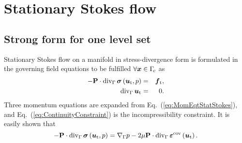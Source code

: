 \documentclass[12pt, twoside, english]{article}
\numberwithin{equation}{section}
\newcommand{\vek}[1]{\mathchoice{\displaystyle\boldsymbol#1}
{\textstyle\boldsymbol#1}{\scriptstyle\boldsymbol#1}
{\scriptscriptstyle\boldsymbol#1}}
\newcommand{\mat}[1]{\mathchoice{\displaystyle\mathbf#1}
{\textstyle\mathbf#1}{\scriptstyle\mathbf#1}
{\scriptscriptstyle\mathbf#1}}
\newcommand{\ti}{ \ensuremath{\mathrm{t} }}
\begin{document}
\section{Stationary Stokes flow}\label{sec:StatStokes}
\subsection{Strong form for one level set}\label{subsec:StStok-sfEq1LS}
Stationary Stokes flow on a manifold in stress-divergence form \cite{Donea_2003a,Fries_2018a,Jankuhn_2018a} is formulated in the governing field equations to be fulfilled $\forall\vek{x}\in\Gamma_{\!c}$ as
\begin{eqnarray}
	-\mat{P}\cdot\mathrm{div}_{\Gamma}\,\vek{\sigma}\left(\vek{u}_\ti,p\right) & = & \vek{f}_\ti,\label{eq:MomEqtStatStokes}\\
	\mathrm{div}_{\Gamma}\,\vek{u}_\ti & = & 0.\label{eq:ContinuityConstraint}
\end{eqnarray}
Three momentum equations are expanded from Eq.~(\ref{eq:MomEqtStatStokes}), and Eq.~(\ref{eq:ContinuityConstraint}) is the incompressibility constraint. It is easily shown that
\begin{equation}
-\mat{P}\cdot\mathrm{div}_{\Gamma}\,\vek{\sigma}\left(\vek{u}_\ti,p\right)=\nabla_{\Gamma}p-2\mu\mat{P}\cdot\mathrm{div}_{\Gamma}\,\vek\varepsilon^{\mathrm{cov}}\left(\vek{u}_\ti \right).\label{eq:DivSigProp}
\end{equation}
\end{document}
